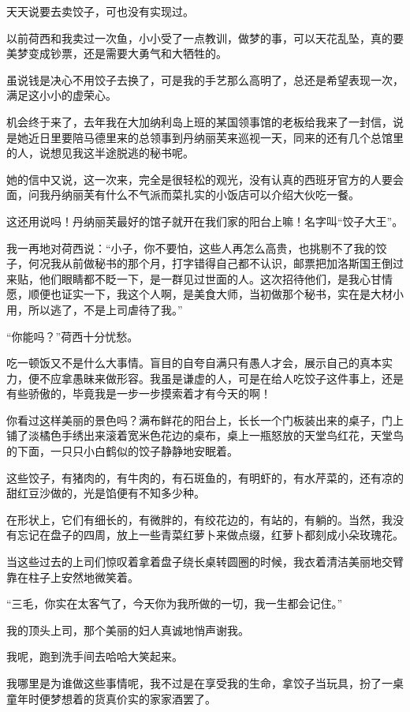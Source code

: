 \par 天天说要去卖饺子，可也没有实现过。
\par 以前荷西和我卖过一次鱼，小小受了一点教训，做梦的事，可以天花乱坠，真的要美梦变成钞票，还是需要大勇气和大牺牲的。
\par 虽说钱是决心不用饺子去换了，可是我的手艺那么高明了，总还是希望表现一次，满足这小小的虚荣心。
\par 机会终于来了，去年我在大加纳利岛上班的某国领事馆的老板给我来了一封信，说是她近日里要陪马德里来的总领事到丹纳丽芙来巡视一天，同来的还有几个总馆里的人，说想见我这半途脱逃的秘书呢。
\par 她的信中又说，这一次来，完全是很轻松的观光，没有认真的西班牙官方的人要会面，问我丹纳丽芙有什么不气派而菜扎实的小饭店可以介绍大伙吃一餐。
\par 这还用说吗！丹纳丽芙最好的馆子就开在我们家的阳台上嘛！名字叫“饺子大王”。
\par 我一再地对荷西说：“小子，你不要怕，这些人再怎么高贵，也挑剔不了我的饺子，何况我从前做秘书的那个月，打字错得自己都不认识，邮票把加洛斯国王倒过来贴，他们眼睛都不眨一下，是一群见过世面的人。这次招待他们，是我心甘情愿，顺便也证实一下，我这个人啊，是美食大师，当初做那个秘书，实在是大材小用，所以逃了，不是上司虐待了我。”
\par “你能吗？”荷西十分忧愁。
\par 吃一顿饭又不是什么大事情。盲目的自夸自满只有愚人才会，展示自己的真本实力，便不应拿愚昧来做形容。我虽是谦虚的人，可是在给人吃饺子这件事上，还是有些骄傲的，毕竟我是一步一步摸索着才有今天的啊！
\par 你看过这样美丽的景色吗？满布鲜花的阳台上，长长一个门板装出来的桌子，门上铺了淡橘色手绣出来滚着宽米色花边的桌布，桌上一瓶怒放的天堂鸟红花，天堂鸟的下面，一只只小白鹤似的饺子静静地安眠着。
\par 这些饺子，有猪肉的，有牛肉的，有石斑鱼的，有明虾的，有水芹菜的，还有凉的甜红豆沙做的，光是馅便有不知多少种。
\par 在形状上，它们有细长的，有微胖的，有绞花边的，有站的，有躺的。当然，我没有忘记在盘子的四周，放上一些青菜红萝卜来做点缀，红萝卜都刻成小朵玫瑰花。
\par 当这些过去的上司们惊叹着拿着盘子绕长桌转圆圈的时候，我衣着清洁美丽地交臂靠在柱子上安然地微笑着。
\par “三毛，你实在太客气了，今天你为我所做的一切，我一生都会记住。”
\par 我的顶头上司，那个美丽的妇人真诚地悄声谢我。
\par 我呢，跑到洗手间去哈哈大笑起来。
\par 我哪里是为谁做这些事情呢，我不过是在享受我的生命，拿饺子当玩具，扮了一桌童年时便梦想着的货真价实的家家酒罢了。


